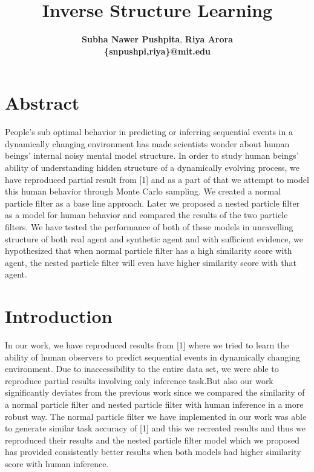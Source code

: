 \documentclass[12pt,letterpaper]{article}
\title{Inverse Structure Learning}
\author{{\large \bf Subha Nawer Pushpita},  {\large \bf Riya Arora}\\
\bf \{snpushpi,riya\}@mit.edu}
\begin{document}
\maketitle


\section{Abstract}
People's sub optimal behavior in predicting or inferring sequential events in a dynamically changing environment has made scientists wonder about human beings' internal noisy mental model structure. In order to study human beings' ability of understanding hidden structure of a dynamically evolving process, we have reproduced partial result from [1] and as a part of that we attempt to model this human behavior through Monte Carlo sampling. We created a normal particle filter as a base line approach. Later we proposed a nested particle filter as a model for human behavior and compared the results of the two particle filters. We have tested the performance of both of these models in unravelling structure of both real agent and synthetic agent and with sufficient evidence, we hypothesized that when normal particle filter has a high similarity score with agent, the nested particle filter will even have higher similarity score with that agent.

\section{Introduction}

In our work, we have reproduced results from [1] where we tried to learn the ability of human observers to predict sequential events in dynamically changing environment. Due to inaccessibility to the entire data set, we were able to reproduce partial results involving only inference task.But also our work significantly deviates from the previous work since we compared the similarity of a normal particle filter and nested particle filter with human inference in a more robust way. The normal particle filter we have implemented in our work was able to generate similar task accuracy of [1] and this we recreated results and thus we reproduced their results and the nested particle filter model which we proposed has provided consistently better results when both models had higher similarity score with human inference.
\end{document}

